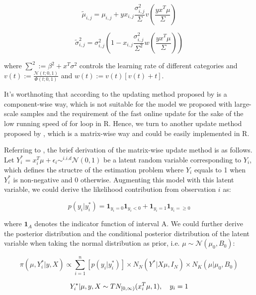 \documentclass{article}
\begin{document}
\begin{equation}
  \tilde{\mu}_{i,j} = {\mu}_{i,j} + y x_{i,j} \frac{\sigma_{i,j}^2}{\Sigma} v(\frac{y x^T \mu}{\Sigma})
\end{equation}

\begin{equation}
  \tilde{\sigma}^2_{i,j} = {\sigma}_{i,j}^2 (1 - x_{i,j} \frac{\sigma_{i,j}^2}{\Sigma^2} w(\frac{y x^T \mu}{\Sigma}))
\end{equation}

where $\sum^2 := \beta^2 + x^T \sigma^2$ controls the learning rate of different categories and $v(t) := \frac{\mathcal{N}(t;0,1)}{\Phi(t;0,1)}$ and $w(t) := v(t) [v(t) + t]$.

It's worthnoting that according to the updating method proposed by \cite{BLIP1,PL} is a component-wise way, which is not suitable for the model we proposed with large-scale samples and the requirement of the fast online update for the sake of the low running speed of for loop in R. Hence, we turn to another update method proposed by \cite{DA}, which is a matrix-wise way and could be easily implemented in R.

Referring to \cite{DA}, the brief derivation of the matrix-wise update method is as follows. Let $Y_i^* = x_i^T \mu + \epsilon_i \sim^{i.i.d} \mathcal{N}(0,1) $ be a latent random variable corresponding to $Y_i$, which defines the structre of the estimation problem where $Y_i$ equals to 1 when $Y_i^*$ is non-negative and 0 otherwise. Augmenting this model with this latent variable, we could derive the likelihood contribution from observation $i$ as:

\begin{equation}
  p(y_i|y_i^*) = \textbf{1}_{y_i = 0}\textbf{1}_{y_i < 0} + \textbf{1}_{y_i = 1}\textbf{1}_{y_i = \geq 0}
\end{equation}

where $\textbf{1}_A$ denotes the indicator function of interval A. We could further derive the posterior distribution and the conditional posterior distribution of the latent variable when taking the normal distribution as prior, i.e. $\mu \sim \mathcal{N}(\mu_0,B_0)$:

\begin{equation}
  \pi (\mu,Y_i^* | y , X) \varpropto \sum_{i=1}^n [p(y_i|y_i^*)] \times N_N(Y^*| X\mu,I_N) \times N_K(\mu| \mu_0 , B_0) 
\end{equation}

\begin{equation}
  Y_i^* | \mu,y,X \sim TN_{[0,\infty)} (x_i^T \mu,1), \quad y_i = 1 \\ 
\end{equation}
  
\end{document}
